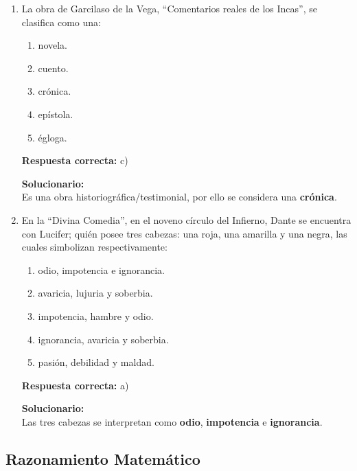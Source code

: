 \begin{enumerate}

\item  La obra de Garcilaso de la Vega, ``Comentarios reales de los Incas'', se clasifica como una:
\begin{enumerate}[label=\alph*)]
	\item novela.
	\item cuento.
	\item crónica.
	\item epístola.
	\item égloga.
\end{enumerate}

\textbf{Respuesta correcta:} c)

\vspace{2mm}
\textbf{Solucionario:}\\
Es una obra historiográfica/testimonial, por ello se considera una \textbf{crónica}.

\item  En la ``Divina Comedia'', en el noveno círculo del Infierno, Dante se encuentra con Lucifer; quién posee tres cabezas: una roja, una amarilla y una negra, las cuales simbolizan respectivamente:
\begin{enumerate}[label=\alph*)]
	\item odio, impotencia e ignorancia.
	\item avaricia, lujuria y soberbia.
	\item impotencia, hambre y odio.
	\item ignorancia, avaricia y soberbia.
	\item pasión, debilidad y maldad.
\end{enumerate}

\textbf{Respuesta correcta:} a)

\vspace{2mm}
\textbf{Solucionario:}\\
Las tres cabezas se interpretan como \textbf{odio}, \textbf{impotencia} e \textbf{ignorancia}.
\end{enumerate}


\subsection*{Razonamiento Matemático}

